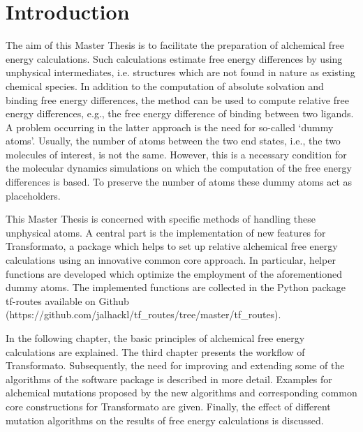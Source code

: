 \chapter{Introduction}

The aim of this Master Thesis is to facilitate the preparation of
alchemical free energy calculations. Such calculations
estimate free energy differences by using unphysical intermediates, i.e. structures
which are not found in nature as existing chemical species. In addition
to the computation of absolute solvation and binding free energy differences,
the method can be used to compute relative free energy differences, e.g.,
the free energy difference of binding between two ligands. A problem occurring
in the latter approach is the need for so-called \textquoteleft dummy
atoms\textquoteright . Usually, the number of atoms between the two
end states, i.e., the two molecules of interest, is not the same.
However, this is a necessary condition for the molecular dynamics
simulations on which the computation of the free energy differences
is based. To preserve the number of atoms these dummy atoms act as
placeholders\cite{Fleck.2021}. 

This Master Thesis is concerned with specific methods of handling these unphysical
atoms. A central part is the implementation of new features
for Transformato, a package which helps to set up relative alchemical
free energy calculations using an innovative common core approach\cite{key-2}\cite{Wieder.2022}.
In particular, helper functions are developed which optimize the employment of
the aforementioned dummy atoms. 
The implemented functions are collected in the  Python package tf-routes available on Github (https://github.com/jalhackl/tf\_routes/tree/master/tf\_routes).

In the following chapter, the basic principles of alchemical free energy
calculations are explained. The third chapter presents the workflow
of Transformato. Subsequently, the need for improving and extending some of the algorithms of the software
package is described in more detail. Examples for alchemical mutations
proposed by the new algorithms and corresponding common core constructions
for Transformato are given. Finally, the effect of different mutation
algorithms on the results of free energy calculations is discussed.